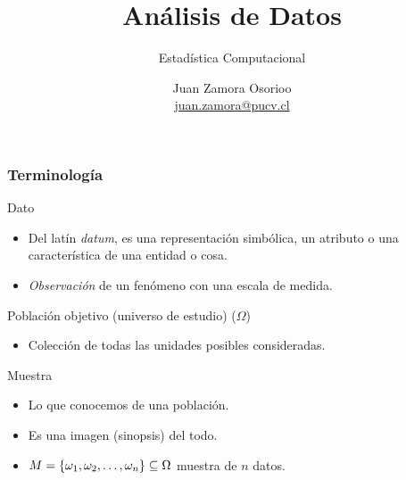 \documentclass[table]{beamer}
\title{Análisis de Datos}
\subtitle{Estadística Computacional}
\author[J.Z.O-2023]{Juan Zamora Osorioo\\\url{juan.zamora@pucv.cl}}
\institute[PUCV]{Instituto de Estadística\\Pontificia Universidad Cat\'olica de Valpara\'iso}
\date{}
\begin{document}
\begin{frame}[plain]
    \titlepage
\end{frame}





\begin{frame}
    \frametitle{Terminología}
    \begin{block}{Dato}
        \begin{itemize}
            \item Del latín \emph{datum}, es una representación simbólica, un atributo o una característica de una entidad o cosa.
            \item \emph{Observación} de un fenómeno con una escala de medida.
        \end{itemize}
    \end{block}
    \begin{block}{Población objetivo (universo de estudio) ($\Omega$)}
        \begin{itemize}
            \item Colección de todas las unidades posibles consideradas.
        \end{itemize}
    \end{block}
    \begin{block}{Muestra}
        \begin{itemize}
            \item Lo que conocemos de una población.
            \item Es una imagen (sinopsis) del todo.
            \item $M = \bparens{\omega_{1} , \omega_{2} , \ldots , \omega_{n}} \subseteq \Omega$ muestra de $n$ datos.
        \end{itemize}
    \end{block}
\end{frame}
\end{document}
